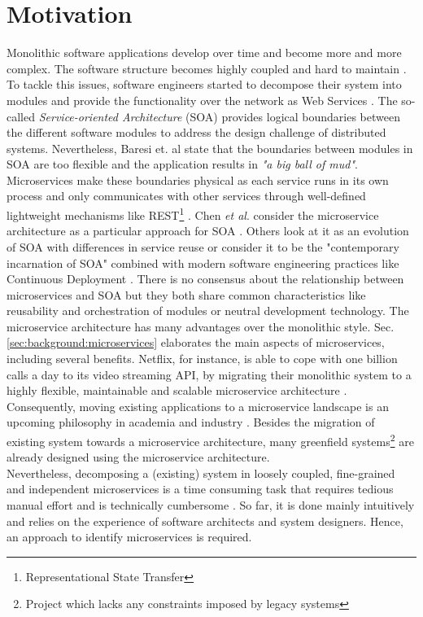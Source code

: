 \section{Motivation}
\label{sec:Introduction:Motivation}
Monolithic software applications develop over time and become more and more complex. The software structure becomes highly coupled and hard to maintain \cite{MigratingTowardsSurvey}. To tackle this issues, software engineers started to decompose their system into modules and provide the functionality over the network as Web Services \cite{ServiceCutter}. The so-called \textit{Service-oriented Architecture} (SOA) provides logical boundaries between the different software modules to address the design challenge of distributed systems. Nevertheless, Baresi et. al\cite{interfaceAnalysisBaresi} state that the boundaries between modules in SOA are too flexible and the application results in \textit{"a big ball of mud"}. Microservices make these boundaries physical as each service runs in its own process and only communicates with other services through well-defined lightweight mechanisms like REST\footnote{Representational State Transfer} \cite{FunctionalDecompositionHeinrich}. Chen \textit{et al}. consider the microservice architecture as a particular approach for SOA \cite{DataflowDrivenChen}. Others look at it as an evolution of SOA with differences in service reuse \cite{interfaceAnalysisBaresi} or consider it to be the "contemporary incarnation of SOA" combined with modern software engineering practices like Continuous Deployment \cite{ServiceCutter}. There is no consensus about the relationship between microservices and SOA but they both share common characteristics like reusability and orchestration of modules or neutral development technology.
The microservice architecture has many advantages over the monolithic style. Sec.\ref{sec:background:microservices} elaborates the main aspects of microservices, including several benefits. Netflix, for instance, is able to cope with one billion calls a day to its video streaming API, by migrating their monolithic system to a highly flexible, maintainable and scalable microservice architecture \cite{DataflowDrivenChen}. Consequently, moving existing applications to a microservice landscape is an upcoming philosophy in academia and industry \cite{ObjectAwareAmiri}. Besides the migration of existing system towards a microservice architecture, many greenfield systems\footnote{Project which lacks any constraints imposed by legacy systems} are already designed using the microservice architecture.\\
Nevertheless, decomposing a (existing) system in loosely coupled, fine-grained and independent microservices is a time consuming task that requires tedious manual effort \cite{ServiceCutter} and is technically cumbersome \cite{HeuristicsAlwis}. So far, it is done mainly intuitively and relies on the experience of software architects and system designers. Hence, an approach to identify microservices is required. 

